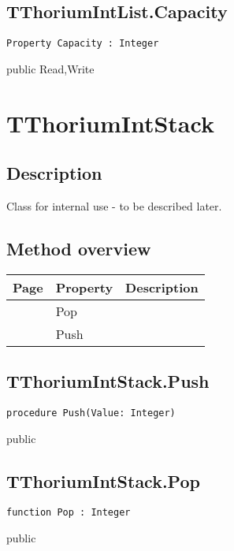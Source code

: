 \subsection{TThoriumIntList.Capacity}
\label{thoriumcorepkg:thorium:tthoriumintlist:capacity}
\begin{FPCList}
\Declaration 

\begin{verbatim}
Property Capacity : Integer
\end{verbatim}
\Visibility
public
\Access
Read,Write
\end{FPCList}
\section{TThoriumIntStack}
\label{thoriumcorepkg:thorium:tthoriumintstack}
\subsection{Description}
Class for internal use - to be described later.%
\subsection{Method overview}
\label{thoriumcorepkg:thorium:tthoriumintstack:methods}
\begin{tabularx}{\textwidth}{llX}
Page & Property & Description  \\ \hline
\pageref{thoriumcorepkg:thorium:tthoriumintstack:pop} & Pop  &  \\
\pageref{thoriumcorepkg:thorium:tthoriumintstack:push} & Push  &  \\
\hline
\end{tabularx}
\subsection{TThoriumIntStack.Push}
\label{thoriumcorepkg:thorium:tthoriumintstack:push}
\begin{FPCList}
\Declaration 

\begin{verbatim}
procedure Push(Value: Integer)
\end{verbatim}
\Visibility
public
\end{FPCList}
\subsection{TThoriumIntStack.Pop}
\label{thoriumcorepkg:thorium:tthoriumintstack:pop}
\begin{FPCList}
\Declaration 

\begin{verbatim}
function Pop : Integer
\end{verbatim}
\Visibility
public
\end{FPCList}
